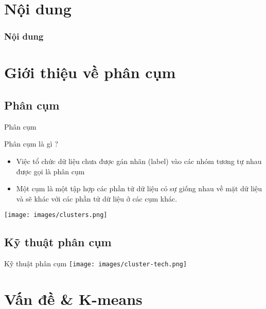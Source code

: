\documentclass[english,10pt,table]{beamer}
\begin{document}
\begin{frame}
  \maketitle
\end{frame}

\section*{Nội dung}
	\begin{frame}\frametitle<presentation>{Nội dung}
  	\tableofcontents
	\end{frame}


\section{Giới thiệu về phân cụm}
\subsection{Phân cụm}
\begin{frame}{Phân cụm}		
	\begin{block}{Phân cụm là gì ?}
		\begin{itemize}\small
	 	\item Việc tổ chức dữ liệu chưa được gán nhãn (label) vào các nhóm tương tự nhau được gọi là phân cụm \\
	 	\item Một cụm là một tập hợp các phần tử dữ liệu có sự giống nhau về mặt dữ liệu và sẽ khác với các phần tử dữ liệu ở các cụm khác.
		\end{itemize}
	 
  \end{block}
\texttt{[image: images/clusters.png]}
\end{frame}

\subsection{Kỹ thuật phân cụm}
\begin{frame}{Kỹ thuật phân cụm}	
	\texttt{[image: images/cluster-tech.png]}
\end{frame}

\section{Vấn đề \& K-means}
\end{document}
